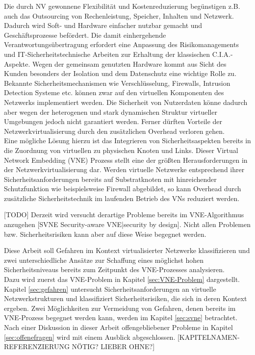 Die durch NV gewonnene Flexibilität und Kostenreduzierung begünstigen z.B. auch das Outsourcing von Rechenleistung, Speicher, Inhalten und Netzwerk. Dadurch wird Soft- und Hardware einfacher nutzbar gemacht und Geschäftsprozesse befördert. Die damit einhergehende Verantwortungsübertragung erfordert eine Anpassung des Risikomanagements und IT-Sicherheitstechnische Arbeiten zur Erhaltung der klassischen C.I.A.-Aspekte. Wegen der gemeinsam genutzten Hardware kommt aus Sicht des Kunden besonders der Isolation und dem Datenschutz eine wichtige Rolle zu.\\
Bekannte Sicherheitsmechanismen wie Verschlüsselung, Firewalls, Intrusion Detection Systeme etc. können zwar auf den virtuellen Komponenten des Netzwerks implementiert werden. Die Sicherheit von Nutzerdaten könne dadurch aber wegen der heterogenen und stark dynamischen Struktur virtueller Umgebungen jedoch nicht garantiert werden. Ferner dürften Vorteile der Netzwerkvirtualisierung durch den zusätzlichen Overhead verloren gehen. \cite{gong2016virtual}\\
Eine mögliche Lösung hierzu ist das Integrieren von Sicherheitsaspekten bereits in die Zuordnung von virtuellen zu physischen Knoten und Links. Dieser Virtual Network Embedding (VNE) Prozess stellt eine der größten Herausforderungen in der Netzwerkvirtualisierung dar. \cite{fischer2013virtual}
Werden virtuelle Netzwerke entsprechend ihrer Sicherheitsanforderungen bereits auf Substratknoten mit hinreichender Schutzfunktion wie beispielsweise Firewall abgebildet, so kann Overhead durch zusätzliche Sicherheitstechnik im laufenden Betrieb des VNs reduziert werden.

[TODO]
Derzeit wird versucht \cite{bays2012security, gong2016virtual, wang2016towards} derartige Probleme bereits im VNE-Algorithmus anzugehen [SVNE Security-aware VNE|security by design]. Nicht allen Problemen bzw. Sicherheitsrisiken kann aber auf diese Weise begegnet werden. %


Diese Arbeit soll Gefahren im Kontext virtualisierter Netzwerke klassifizieren und zwei unterschiedliche Ansätze zur Schaffung eines möglichst hohen Sicherheitsniveaus bereits zum Zeitpunkt des VNE-Prozesses analysieren.\\
Dazu wird zuerst das VNE-Problem in Kapitel \ref{sec:VNE-Problem} \textit{} dargestellt. Kapitel \ref{sec:gefahren} \textit{} untersucht Sicherheitsanforderungen an virtuelle Netzwerkstrukturen und klassifiziert Sicherheitsrisiken, die sich in deren Kontext ergeben. Zwei Möglichkeiten zur Vermeidung von Gefahren, denen bereits im VNE-Prozess begegnet werden kann, werden im Kapitel \ref{sec:svne} \textit{} betrachtet. Nach einer Diskussion in dieser Arbeit offengebliebener Probleme in Kapitel \ref{sec:offenefragen} \textit{} wird mit einem Ausblick abgeschlossen.
[KAPITELNAMEN-REFERENZIERUNG NÖTIG? LIEBER OHNE?]